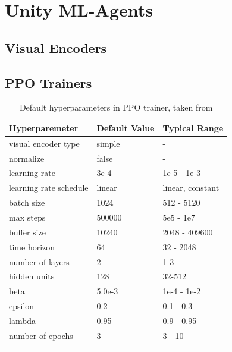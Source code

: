 
\section{Unity ML-Agents}\label{appendix:mlagents}

\subsection{Visual Encoders}\label{appendix:visual-encoders}


\subsection{PPO Trainers}\label{appendix:ppo-trainer}

\begin{longtable}{@{} p{3.5cm} p{2.5cm} p{2.5cm} @{}} \toprule
\textbf{Hyperparemeter}       & \textbf{Default Value} & \textbf{Typical Range} \\ \midrule
visual encoder type         & simple    & - \\ 
normalize                   & false     & - \\
learning rate               & 3e-4      & 1e-5 - 1e-3 \\ 
learning rate schedule      & linear    & linear, constant \\ 
batch size                  &  1024     & 512 - 5120 \\
max steps                   &  500000   & 5e5 - 1e7 \\ 
buffer size                 & 10240     & 2048 - 409600 \\ 
time horizon                &  64       & 32 - 2048  \\
number of layers            &  2        & 1-3 \\
hidden units                &  128      & 32-512 \\
beta                        &  5.0e-3   & 1e-4 - 1e-2  \\
epsilon                     &  0.2      & 0.1 - 0.3  \\
lambda                      &  0.95     & 0.9 - 0.95  \\
number of epochs            & 3         & 3 - 10 \\ \bottomrule
\caption{Default hyperparameters in PPO trainer, taken from \cite{unitymlagentsgithub}} \label{tab:default-hyperparameters}
\end{longtable}

